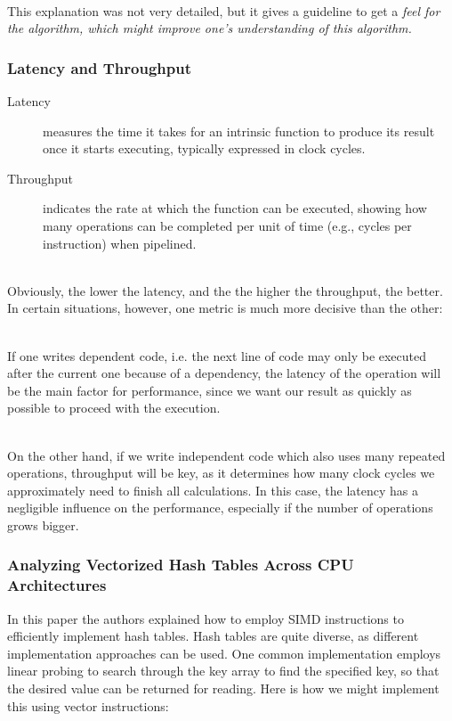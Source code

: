 \documentclass[../../main.tex]{subfiles}
\begin{document}
~\\
This explanation was not very detailed, but it gives a guideline to get a \em feel \em for the algorithm, which might improve one's understanding of this algorithm.


\bigskip
\subsubsection{Latency and Throughput}
\begin{description}
    \item[Latency] measures the time it takes for an intrinsic function to produce its result once it starts executing, typically expressed in clock cycles.
    \item[Throughput] indicates the rate at which the function can be executed, showing how many operations can be completed per unit of time (e.g., cycles per instruction) when pipelined.
\end{description}

~\\
Obviously, the lower the latency, and the the higher the throughput, the better. In certain situations, however, one metric is much more decisive than the other:

~\\
If one writes dependent code, i.e. the next line of code may only be executed after the current one because of a dependency, the latency of the operation will be the main factor for performance, since we want our result as quickly as possible to proceed with the execution.

~\\
On the other hand, if we write independent code which also uses many repeated operations, throughput will be key, as it determines how many clock cycles we approximately need to finish all calculations.
In this case, the latency has a negligible influence on the performance, especially if the number of operations grows bigger.

\bigskip
\subsubsection{Analyzing Vectorized Hash Tables Across CPU Architectures}
In this paper the authors explained how to employ SIMD instructions to efficiently implement hash tables. Hash tables are quite diverse, as different implementation approaches can be used. One common implementation employs linear probing to search through the key array to find the specified key, so that the desired value can be returned for reading. Here is how we might implement this using vector instructions:
\end{document}

